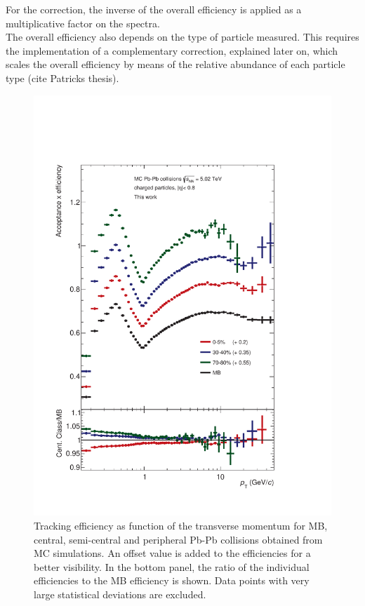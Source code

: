 \documentclass[12pt,a4paper]{report}
\begin{document}
For the correction, the inverse of the overall efficiency is applied as a multiplicative factor on the \pt spectra.\\
The overall efficiency also depends on the type of particle measured. This requires the implementation of a complementary correction, explained later on, which scales the overall efficiency by means of the relative abundance of each particle type (cite Patricks thesis).\\
\begin{figure}[tb!]
\centering
\includegraphics[width=12cm]{Plots/trckEffPbPb1.pdf}  
\caption{Tracking efficiency as function of the transverse momentum for MB, central, semi-central and peripheral Pb-Pb collisions obtained from MC simulations. An offset value is added to the efficiencies for a better visibility. In the bottom panel, the ratio of the individual efficiencies to the MB efficiency is shown. Data points with very large statistical deviations are excluded.}
\label{trckEffPbPb1}
\end{figure}
\end{document}
